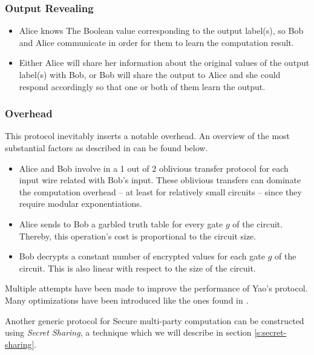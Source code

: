 \subsubsection{Output Revealing}
\begin{itemize}
  \item Alice knows The Boolean value corresponding to the output label(s), so Bob and Alice communicate in order for them to learn the computation result.
  \item Either Alice will share her information about the original values of the output label(s) with Bob, or Bob will share the output to Alice and she could respond accordingly so that one or both of them learn the output.
\end{itemize}

\subsubsection{Overhead}
This protocol inevitably inserts a notable overhead. An overview of the most substantial factors as described in \cite{lindell2009secure} can be found below.

\begin{itemize}
  \item Alice and Bob involve in a 1 out of 2 oblivious transfer protocol for each input wire related with Bob's input. These oblivious transfers can dominate the computation overhead -- at least for relatively small circuits -- since they require modular exponentiations.
  \item Alice sends to Bob a garbled truth table for every gate $g$ of the circuit. Thereby, this operation's cost is proportional to the circuit size.
  \item Bob decrypts a constant number of encrypted values for each gate $g$ of the circuit. This is also linear with respect to the size of the circuit.
\end{itemize}

Multiple attempts have been made to improve the performance of Yao's protocol. Many optimizations have been introduced like the ones found in \cite{beaver1990round, naor1999privacy, kolesnikov2008improved, bellare2013efficient, zahur2015two}.

Another generic protocol for Secure multi\hyp party computation can be constructed using \textit{Secret Sharing}, a technique which we will describe in section \ref{s:secret-sharing}.

